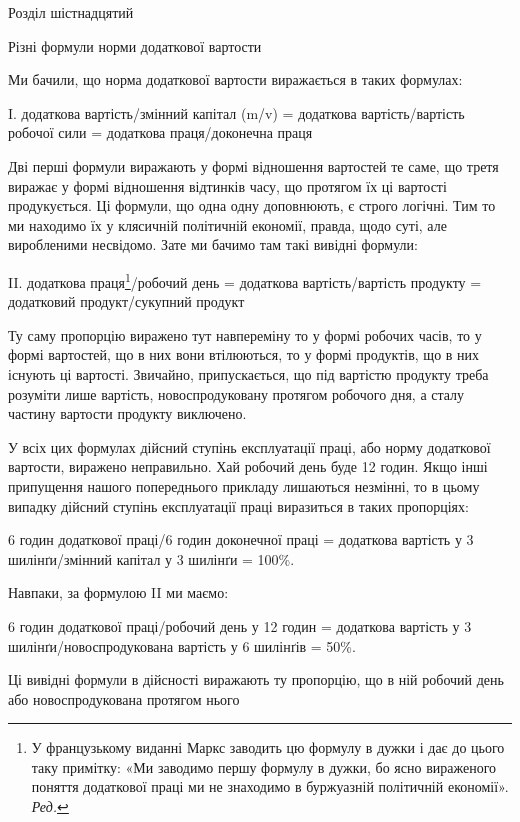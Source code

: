 Розділ шістнадцятий

Різні формули норми додаткової вартости

Ми бачили, що норма додаткової вартости виражається в таких
формулах:

I. додаткова вартість/змінний капітал (m/v) =
додаткова вартість/вартість робочої сили =
додаткова праця/доконечна праця

Дві перші формули виражають у формі відношення вартостей
те саме, що третя виражає у формі відношення відтинків часу,
що протягом їх ці вартості продукується. Ці формули, що одна
одну доповнюють, є строго логічні. Тим то ми находимо їх у клясичній
політичній економії, правда, щодо суті, але виробленими
несвідомо. Зате ми бачимо там такі вивідні формули:

II. додаткова праця\footnote*{
У французькому виданні Маркс заводить цю формулу в дужки
і дає до цього таку примітку: «Ми заводимо першу формулу в дужки,
бо ясно вираженого поняття додаткової праці ми не знаходимо в буржуазній
політичній економії». \emph{Ред.}
}/робочий день =
додаткова вартість/вартість продукту =
додатковий продукт/сукупний продукт

Ту саму пропорцію виражено тут навпереміну то у формі
робочих часів, то у формі вартостей, що в них вони втілюються,
то у формі продуктів, що в них існують ці вартості. Звичайно,
припускається, що під вартістю продукту треба розуміти лише
вартість, новоспродуковану протягом робочого дня, а сталу частину
вартости продукту виключено.

У всіх цих формулах дійсний ступінь експлуатації праці, або
норму додаткової вартости, виражено неправильно. Хай робочий
день буде 12 годин. Якщо інші припущення нашого попереднього
прикладу лишаються незмінні, то в цьому випадку дійсний
ступінь експлуатації праці виразиться в таких пропорціях:

6    годин додаткової праці/6 годин доконечної праці =
додаткова вартість у 3 шилінґи/змінний капітал у 3 шилінґи = 100\%.

Навпаки, за формулою II ми маємо:

6 годин додаткової праці/робочий день у 12 годин =
додаткова вартість у 3 шилінґи/новоспродукована вартість у 6 шилінґів =
50\%.

Ці вивідні формули в дійсності виражають ту пропорцію,
що в ній робочий день або новоспродукована протягом нього